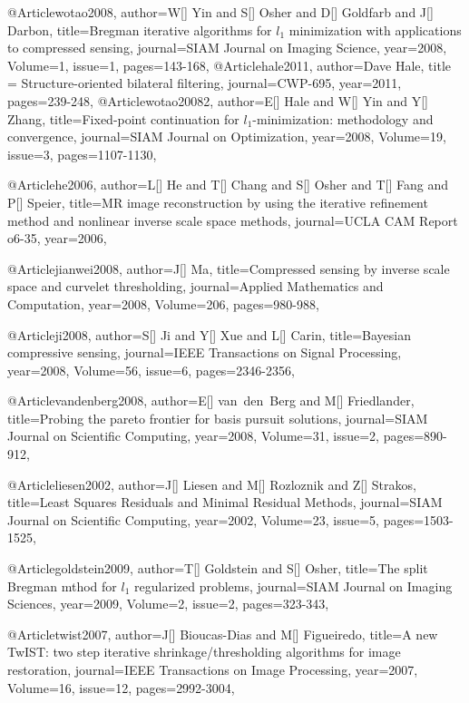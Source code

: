 {@Article{wotao2008,
  author={W[] Yin and S[] Osher and D[] Goldfarb and J[] Darbon},
  title={Bregman iterative algorithms for $l_1$ minimization with applications to compressed sensing},
  journal={SIAM Journal on Imaging Science},
  year=2008,
  Volume=1,
  issue=1,
  pages={143-168},
}
@Article{hale2011,
  author={Dave Hale},
  title = {Structure-oriented bilateral filtering},
  journal={CWP-695},
  year=2011,
  pages={239-248},
}
@Article{wotao20082,
  author={E[] Hale and W[] Yin and Y[] Zhang},
  title={Fixed-point continuation for $l_1$-minimization: methodology and convergence},
  journal={SIAM Journal on Optimization},
  year=2008,
  Volume=19,
  issue=3,
  pages={1107-1130},
}

@Article{he2006,
  author={L[] He and T[] Chang and S[] Osher and T[] Fang and P[] Speier},
  title={MR image reconstruction by using the iterative refinement method and nonlinear inverse scale space methods},
  journal={UCLA CAM Report o6-35},
  year=2006,
}

@Article{jianwei2008,
  author={J[] Ma},
  title={Compressed sensing by inverse scale space and curvelet thresholding},
  journal={Applied Mathematics and Computation},
  year=2008,
  Volume=206,
  pages={980-988},
}

@Article{ji2008,
  author={S[] Ji and Y[] Xue and L[] Carin},
  title={Bayesian compressive sensing},
  journal={IEEE Transactions on Signal Processing},
  year=2008,
  Volume=56,
  issue=6,
  pages={2346-2356},
}

@Article{vandenberg2008,
  author={E[] van~den~Berg and M[] Friedlander},
  title={Probing the pareto frontier for basis pursuit solutions},
  journal={SIAM Journal on Scientific Computing},
  year=2008,
  Volume=31,
  issue=2,
  pages={890-912},
}

@Article{liesen2002,
  author={J[] Liesen and M[] Rozloznik and Z[] Strakos},
  title={Least Squares Residuals and Minimal Residual Methods},
  journal={SIAM Journal on Scientific Computing},
  year=2002,
  Volume=23,
  issue=5,
  pages={1503-1525},
}

@Article{goldstein2009,
  author={T[] Goldstein and S[] Osher},
  title={The split Bregman mthod for $l_1$ regularized problems},
  journal={SIAM Journal on Imaging Sciences},
  year=2009,
  Volume=2,
  issue=2,
  pages={323-343},
}



@Article{twist2007,
  author={J[] Bioucas-Dias and M[] Figueiredo},
  title={A new TwIST: two step iterative shrinkage/thresholding algorithms for image restoration},
  journal={IEEE Transactions on Image Processing},
  year=2007,
  Volume=16,
  issue=12,
  pages={2992-3004},
}

}
